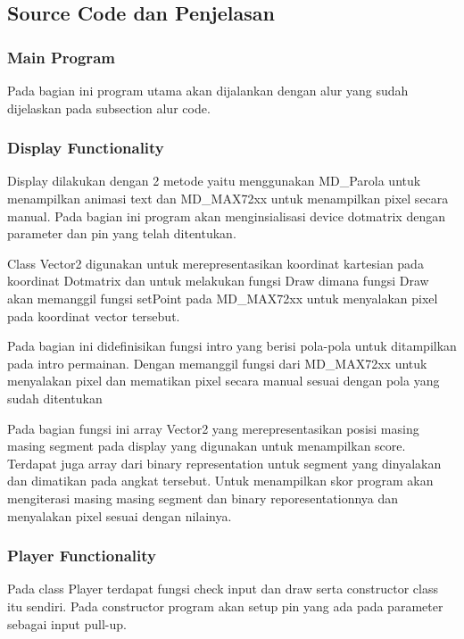 \documentclass[a4paper,12pt]{article}
\begin{document}
\subsection{Source Code dan Penjelasan}
\subsubsection{Main Program}
Pada bagian ini program utama akan dijalankan dengan alur yang sudah dijelaskan pada subsection alur code.

\subsubsection{Display Functionality}
Display dilakukan dengan 2 metode yaitu menggunakan MD\_Parola untuk menampilkan animasi text dan MD\_MAX72xx untuk menampilkan
pixel secara manual. Pada bagian ini program akan menginsialisasi device dotmatrix dengan parameter dan pin yang telah ditentukan.


Class Vector2 digunakan untuk merepresentasikan koordinat kartesian pada koordinat Dotmatrix dan untuk melakukan fungsi Draw
dimana fungsi Draw akan memanggil fungsi setPoint pada MD\_MAX72xx untuk menyalakan pixel pada koordinat vector tersebut.


Pada bagian ini didefinisikan fungsi intro yang berisi pola-pola untuk ditampilkan pada intro permainan. Dengan
memanggil fungsi dari MD\_MAX72xx untuk menyalakan pixel dan mematikan pixel secara manual sesuai dengan pola yang sudah ditentukan


Pada bagian fungsi ini array Vector2 yang merepresentasikan posisi masing masing segment pada display yang digunakan
untuk menampilkan score. Terdapat juga array dari binary representation untuk segment yang dinyalakan dan dimatikan pada angkat tersebut.
Untuk menampilkan skor program akan mengiterasi masing masing segment dan binary reporesentationnya dan menyalakan pixel sesuai dengan nilainya.


\subsubsection{Player Functionality}
Pada class Player terdapat fungsi check input dan draw serta constructor class itu sendiri. Pada constructor
program akan setup pin yang ada pada parameter sebagai input pull-up.
\end{document}
